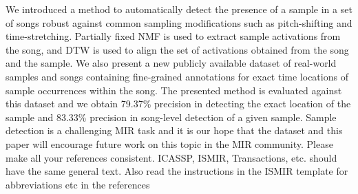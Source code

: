 \documentclass{article}
\begin{document}
We introduced a method to automatically detect the presence of a sample in a set of songs robust against common sampling modifications such as pitch-shifting and time-stretching. Partially fixed NMF is used to extract sample activations from the song, and DTW is used to align the set of activations obtained from the song and the sample. 
We also present a new publicly available dataset of real-world samples and songs containing fine-grained annotations for exact time locations of sample occurrences within the song. The presented method is evaluated against this dataset and we obtain 79.37\% precision in detecting the exact location of the sample and 83.33\% precision in song-level detection of a given sample. %
Sample detection is a challenging MIR task and it is our hope that the dataset and this paper will encourage future work on this topic in the MIR community.
{\color{red} Please make all your references consistent. ICASSP, ISMIR, Transactions, etc. should have the same general text. Also read the instructions in the ISMIR template for abbreviations etc in the references} 


%
%
%
%
\end{document}
